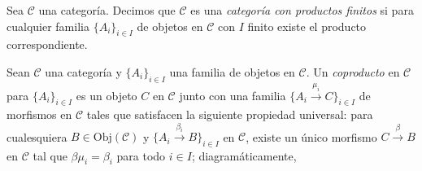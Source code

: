 \documentclass[tesis]{subfiles}
\begin{document}
\begin{Def}\label{Def: Categoría con productos finitos}
    Sea $\mathscr{C}$ una categoría. Decimos que $\mathscr{C}$ es una \emph{categoría con productos finitos} si para cualquier familia $\{A_i\}_{i\in I}$ de objetos en $\mathscr{C}$ con $I$ finito existe el producto correspondiente.
\end{Def}

\begin{Def}\label{Def: Coproducto}
    Sean $\mathscr{C}$ una categoría y $\{A_i\}_{i\in I}$ una familia de objetos en $\mathscr{C}$. Un \emph{coproducto} en $\mathscr{C}$ para $\{A_i\}_{i\in I}$ es un objeto $C$ en $\mathscr{C}$ junto con una familia $\{A_i\xrightarrow[]{\mu_i} C\}_{i\in I}$ de morfismos en $\mathscr{C}$ tales que satisfacen la siguiente propiedad universal: para cualesquiera $B\in\text{Obj}(\mathscr{C})$ y $\{A_i\xrightarrow[]{\beta_i} B\}_{i\in I}$ en $\mathscr{C}$, existe un único morfismo $C\xrightarrow[]{\beta} B$ en $\mathscr{C}$ tal que $\beta\mu_i = \beta_i$ para todo $i\in I$; diagramáticamente,
    \begin{center}
    \end{center}
\end{Def}
\end{document}
